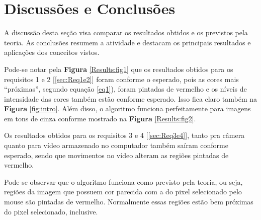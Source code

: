 \documentclass{bmvc2k}
\begin{document}
\section{Discussões e Conclusões}
\label{sec:Conclusion}
A discussão desta seção visa comparar os resultados obtidos e os previstos pela teoria. As conclusões resumem a atividade e destacam os principais resultados e aplicações dos conceitos vistos.

Pode-se notar pela \textbf{Figura} \ref{Results:fig1} que os resultados obtidos para os requisitos 1 e 2 [\ref{sec:Req1e2}] foram conforme o esperado, pois as cores mais ``próximas'', segundo equação \ref{eq1}), foram pintadas de vermelho e os níveis de intensidade das cores também estão conforme esperado. Isso fica claro também na \textbf{Figura} \ref{fig:intro}. Além disso, o algoritmo funciona perfeitamente para imagens em tons de cinza conforme mostrado na \textbf{Figura} \ref{Results:fig2}.

Os resultados obtidos para os requisitos 3 e 4 [\ref{sec:Req3e4}], tanto pra câmera quanto para vídeo armazenado no computador também saíram conforme esperado, sendo que movimentos no vídeo alteram as regiões pintadas de vermelho.

Pode-se observar que o algoritmo funciona como previsto pela teoria, ou seja, regiões da imagem que possuem cor parecida com a do pixel selecionado pelo mouse são pintadas de vermelho. Normalmente essas regiões estão bem próximas do pixel selecionado, inclusive. 


\end{document}
